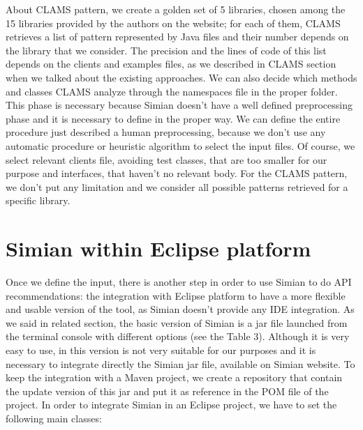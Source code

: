 About CLAMS pattern, we create a golden set of 5 libraries, chosen among the 15 libraries provided by the authors on the website; for each of them, CLAMS retrieves a list of pattern represented by Java files and their number depends on the library that we consider. The precision and the lines of code of this list depends on the clients and examples files, as we described in CLAMS section when we talked about the existing approaches. We can also decide which methods and classes CLAMS analyze through the namespaces file in the proper folder. This phase is necessary because Simian doesn't have a well defined preprocessing phase and it is necessary to define in the proper way. We can define the entire procedure just described a human preprocessing, because we don't use any automatic procedure or heuristic algorithm to select the input files. Of course, we select relevant clients file, avoiding test classes, that are too smaller for our purpose and interfaces, that haven't no relevant body. For the CLAMS pattern, we don't put any limitation and we consider all possible patterns retrieved for a specific library.


\section{Simian within Eclipse platform}
Once we define the input, there is another step in order to use Simian to do API recommendations: the integration with Eclipse platform to have a more flexible and usable version of the tool, as Simian doesn't provide any IDE integration. As we said in related section, the basic version of Simian is a jar file launched from the terminal console with different options (see the Table 3). Although it is very easy to use, in this version is not very suitable for our purposes and it is necessary to integrate directly the Simian jar file, available on Simian website. To keep the integration with a Maven project, we create a repository that contain the update version of this jar and put it as reference in the POM file of the project. 
In order to integrate Simian in an Eclipse project, we have to set the following main classes: 


